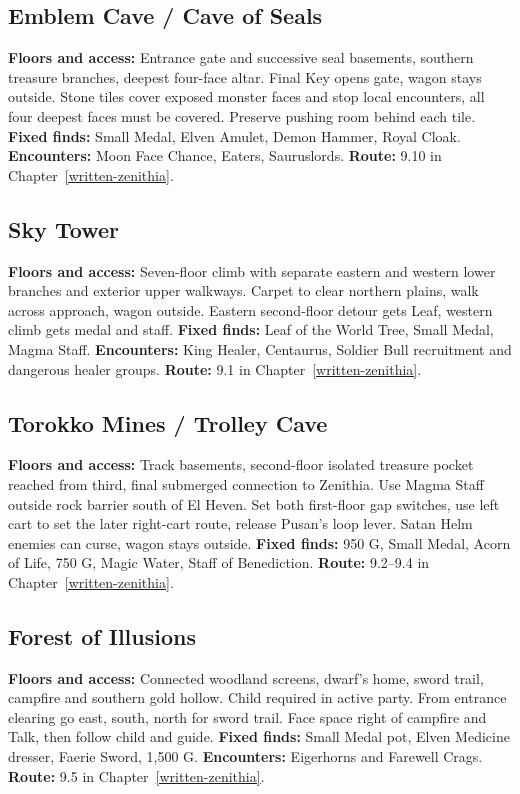 \subsection{Emblem Cave / Cave of Seals}
\label{atlas-emblem}
\textbf{Floors and access:} Entrance gate and successive seal basements, southern treasure branches, deepest four-face altar. Final Key opens gate, wagon stays outside. Stone tiles cover exposed monster faces and stop local encounters, all four deepest faces must be covered. Preserve pushing room behind each tile. \textbf{Fixed finds:} Small Medal, Elven Amulet, Demon Hammer, Royal Cloak. \textbf{Encounters:} Moon Face Chance, Eaters, Sauruslords. \textbf{Route:} 9.10 in Chapter~\ref{written-zenithia}.

\subsection{Sky Tower}
\label{atlas-sky}
\textbf{Floors and access:} Seven-floor climb with separate eastern and western lower branches and exterior upper walkways. Carpet to clear northern plains, walk across approach, wagon outside. Eastern second-floor detour gets Leaf, western climb gets medal and staff. \textbf{Fixed finds:} Leaf of the World Tree, Small Medal, Magma Staff. \textbf{Encounters:} King Healer, Centaurus, Soldier Bull recruitment and dangerous healer groups. \textbf{Route:} 9.1 in Chapter~\ref{written-zenithia}.

\subsection{Torokko Mines / Trolley Cave}
\label{atlas-torokko}
\textbf{Floors and access:} Track basements, second-floor isolated treasure pocket reached from third, final submerged connection to Zenithia. Use Magma Staff outside rock barrier south of El Heven. Set both first-floor gap switches, use left cart to set the later right-cart route, release Pusan's loop lever. Satan Helm enemies can curse, wagon stays outside. \textbf{Fixed finds:} 950 G, Small Medal, Acorn of Life, 750 G, Magic Water, Staff of Benediction. \textbf{Route:} 9.2--9.4 in Chapter~\ref{written-zenithia}.

\subsection{Forest of Illusions}
\label{atlas-forest}
\textbf{Floors and access:} Connected woodland screens, dwarf's home, sword trail, campfire and southern gold hollow. Child required in active party. From entrance clearing go east, south, north for sword trail. Face space right of campfire and Talk, then follow child and guide. \textbf{Fixed finds:} Small Medal pot, Elven Medicine dresser, Faerie Sword, 1,500 G. \textbf{Encounters:} Eigerhorns and Farewell Crags. \textbf{Route:} 9.5 in Chapter~\ref{written-zenithia}.

